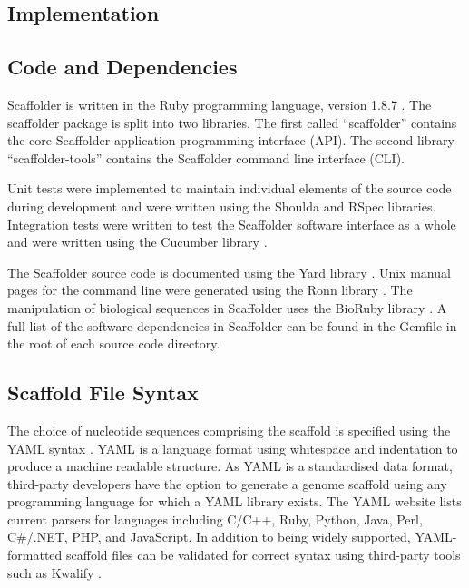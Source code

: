 \documentclass[10pt]{bmc_article}
\newenvironment{bmcformat}{\begin{raggedright}\baselineskip20pt\sloppy\setboolean{publ}{false}}{\end{raggedright}\baselineskip20pt\sloppy}
\begin{document}
\begin{bmcformat}
\clearpage

\section*{Implementation} %

\subsection*{Code and Dependencies} %

Scaffolder is written in the Ruby programming language, version 1.8.7
\cite{ruby-lang}. The scaffolder package is split into two libraries. The first
called ``scaffolder'' contains the core Scaffolder application programming
interface (API). The second library ``scaffolder-tools'' contains the
Scaffolder command line interface (CLI). \pb

Unit tests were implemented to maintain individual elements of the source code
during development and were written using the Shoulda and RSpec \cite{rspec}
libraries. Integration tests were written to test the Scaffolder software
interface as a whole and were written using the Cucumber library \cite{rspec}.
\pb

The Scaffolder source code is documented using the Yard library \cite{yard}.
Unix manual pages for the command line were generated using the Ronn library
\cite{ronn}. The manipulation of biological sequences in Scaffolder uses the
BioRuby library \cite{goto2010}. A full list of the software dependencies in
Scaffolder can be found in the Gemfile in the root of each source code
directory. \pb

\subsection*{Scaffold File Syntax} %

The choice of nucleotide sequences comprising the scaffold is specified using
the YAML syntax \cite{yaml}. YAML is a language format using whitespace and
indentation to produce a machine readable structure. As YAML is a standardised
data format, third-party developers have the option to generate a genome
scaffold using any programming language for which a YAML library exists. The
YAML website lists current parsers for languages including C/C++, Ruby, Python,
Java, Perl, C\#/.NET, PHP, and JavaScript. In addition to being widely
supported, YAML-formatted scaffold files can be validated for correct syntax
using third-party tools such as Kwalify \cite{kwalify}. \pb


\end{bmcformat}
\end{document}
